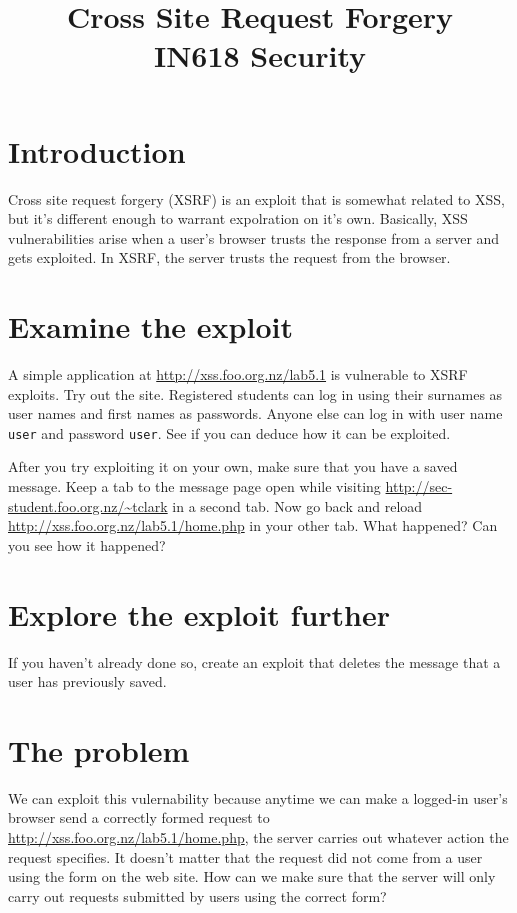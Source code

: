\documentclass{article}
\begin{document}
\title{Cross Site Request Forgery\\ IN618 Security}
\date{}
\maketitle

\section*{Introduction}
Cross site request forgery (XSRF) is an exploit that is somewhat related to XSS,
but it's different enough to warrant expolration on it's own.  Basically,
XSS vulnerabilities arise when a user's browser trusts the response from a
server and gets exploited.  In XSRF, the server trusts the request from the 
browser.

\section{Examine the exploit}
A simple application at \url{http://xss.foo.org.nz/lab5.1} is vulnerable
to XSRF exploits. Try out the site.  Registered students can log in using their surnames
as user names and first names as passwords. Anyone else can log in with user name \texttt{user}
and password \texttt{user}. See if you can deduce how it can be exploited. 

After you try exploiting it on your own, make sure that you have a saved 
message. Keep a tab to the message page open while visiting 
\url{http://sec-student.foo.org.nz/~tclark} in a second tab.  Now go back
and reload \url{http://xss.foo.org.nz/lab5.1/home.php} in your other tab.
What happened?  Can you see how it happened?

\newpage

\section{Explore the exploit further}
If you haven't already done so, create an exploit that deletes the message that a user has previously saved.

\vspace{75mm}

\section{The problem}
We can exploit this vulernability because anytime we can make a logged-in user's browser send a correctly formed request to \url{http://xss.foo.org.nz/lab5.1/home.php}, the server carries out whatever action the request specifies. It doesn't matter that the request did not come from a user using the form on the web site. How can we make sure that the server will only carry out requests submitted by users using the correct form?
\end{document}
